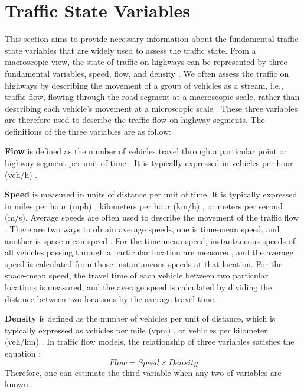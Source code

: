 \documentclass[english]{kththesis}
\begin{document}
\section{Traffic State Variables}
This section aims to provide necessary information about the fundamental traffic state variables that are widely used to assess the traffic state. From a macroscopic view, the state of traffic on highways can be represented by three fundamental variables, speed, flow, and density \cite{seo_tse, elefteriadou_traffic_flow_theory}. We often assess the traffic on highways by describing the movement of a group of vehicles as a stream, i.e., traffic flow, flowing through the road segment at a macroscopic scale, rather than describing each vehicle's movement at a microscopic scale \cite{elefteriadou_traffic_flow_theory}. These three variables are therefore used to describe the traffic flow on highway segments. The definitions of the three variables are as follow:

\textbf{Flow} is defined as the number of vehicles travel through a particular point or highway segment per unit of time \cite{elefteriadou_traffic_flow_theory}. It is typically expressed in vehicles per hour (veh/h) \cite{seo_tse, elefteriadou_traffic_flow_theory}.

\textbf{Speed} is measured in units of distance per unit of time. It is typically expressed in miles per hour (mph) \cite{elefteriadou_traffic_flow_theory}, kilometers per hour (km/h) \cite{seo_tse}, or meters per second (m/s). Average speeds are often used to describe the movement of the traffic flow \cite{seo_tse, elefteriadou_traffic_flow_theory}. There are two ways to obtain average speeds, one is time-mean speed, and another is space-mean speed \cite{elefteriadou_traffic_flow_theory}. For the time-mean speed, instantaneous speeds of all vehicles passing through a particular location are measured, and the average speed is calculated from those instantaneous speeds at that location. For the space-mean speed, the travel time of each vehicle between two particular locations is measured, and the average speed is calculated by dividing the distance between two locations by the average travel time.

\textbf{Density} is defined as the number of vehicles per unit of distance, which is typically expressed as vehicles per mile (vpm) \cite{elefteriadou_traffic_flow_theory}, or vehicles per kilometer (veh/km) \cite{seo_tse}. In traffic flow models, the relationship of three variables satisfies the equation \cite{seo_tse, elefteriadou_traffic_flow_theory}:
\begin{equation}
    Flow = Speed \times Density
    \label{eq:basic_traffic_variable_relation}
\end{equation}
Therefore, one can estimate the third variable when any two of variables are known \cite{elefteriadou_traffic_flow_theory}.
\end{document}

